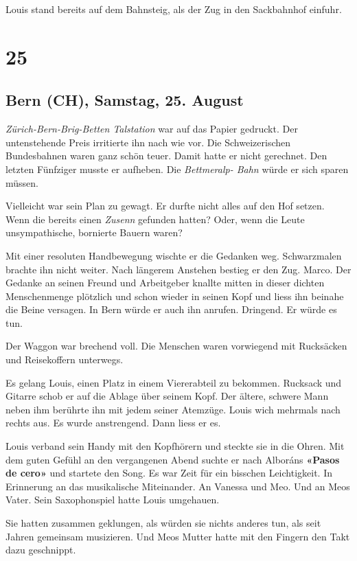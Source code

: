 Louis stand bereits auf dem Bahnsteig, als der Zug in den Sackbahnhof
einfuhr.

\chapter{25}\label{section-24}

\section{Bern (CH), Samstag, 25.
August}\label{bern-ch-samstag-25.-august}

\emph{Zürich-Bern-Brig-Betten Talstation} war auf das Papier gedruckt.
Der untenstehende Preis irritierte ihn nach wie vor. Die Schweizerischen
Bundesbahnen waren ganz schön teuer. Damit hatte er nicht gerechnet. Den
letzten Fünfziger musste er aufheben. Die \emph{Bettmeralp- Bahn} würde
er sich sparen müssen.

Vielleicht war sein Plan zu gewagt. Er durfte nicht alles auf den Hof
setzen. Wenn die bereits einen \emph{Zusenn} gefunden hatten? Oder, wenn
die Leute unsympathische, bornierte Bauern waren?

Mit einer resoluten Handbewegung wischte er die Gedanken weg.
Schwarzmalen brachte ihn nicht weiter. Nach längerem Anstehen bestieg er
den Zug. Marco. Der Gedanke an seinen Freund und Arbeitgeber knallte
mitten in dieser dichten Menschenmenge plötzlich und schon wieder in
seinen Kopf und liess ihn beinahe die Beine versagen. In Bern würde er
auch ihn anrufen. Dringend. Er würde es tun.

Der Waggon war brechend voll. Die Menschen waren vorwiegend mit
Rucksäcken und Reisekoffern unterwegs.

Es gelang Louis, einen Platz in einem Viererabteil zu bekommen. Rucksack
und Gitarre schob er auf die Ablage über seinem Kopf. Der ältere,
schwere Mann neben ihm berührte ihn mit jedem seiner Atemzüge. Louis
wich mehrmals nach rechts aus. Es wurde anstrengend. Dann liess er es.

Louis verband sein Handy mit den Kopfhörern und steckte sie in die
Ohren. Mit dem guten Gefühl an den vergangenen Abend suchte er nach
Alboráns \textbf{«Pasos de cero»} und startete den Song. Es war Zeit für
ein bisschen Leichtigkeit. In Erinnerung an das musikalische
Miteinander. An Vanessa und Meo. Und an Meos Vater. Sein Saxophonspiel
hatte Louis umgehauen.

Sie hatten zusammen geklungen, als würden sie nichts anderes tun, als
seit Jahren gemeinsam musizieren. Und Meos Mutter hatte mit den Fingern
den Takt dazu geschnippt.

